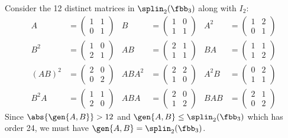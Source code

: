 \begin{sol}
    Consider the 12 distinct matrices in $\splin_2(\fbb_3)$ along with $I_2$:
    \begin{align*}
        A & = 
        \begin{pmatrix}
        1 & 1 \\
        0 & 1
        \end{pmatrix}
        &
        B & = 
        \begin{pmatrix}
        1 & 0 \\
        1 & 1
        \end{pmatrix}
        &
        A^2 & = 
        \begin{pmatrix}
        1 & 2 \\
        0 & 1
        \end{pmatrix}
        \\
        B^2 & = 
        \begin{pmatrix}
        1 & 0 \\
        2 & 1
        \end{pmatrix}
        &
        AB & = 
        \begin{pmatrix}
        2 & 1 \\
        1 & 1
        \end{pmatrix}
        &
        BA & = 
        \begin{pmatrix}
        1 & 1 \\
        1 & 2
        \end{pmatrix}
        \\
        (AB)^2 & = 
        \begin{pmatrix}
        2 & 0 \\
        0 & 2
        \end{pmatrix}
        &
        ABA^2 & = 
        \begin{pmatrix}
        2 & 2 \\
        1 & 0
        \end{pmatrix}
        &
        A^2 B & = 
        \begin{pmatrix}
        0 & 2 \\
        1 & 1
        \end{pmatrix}
        \\
        B^2 A & = 
        \begin{pmatrix}
        1 & 1 \\
        2 & 0
        \end{pmatrix}
        &
        ABA & = 
        \begin{pmatrix}
        2 & 0 \\
        1 & 2
        \end{pmatrix}
        &
        BAB & = 
        \begin{pmatrix}
        2 & 1 \\
        0 & 2
        \end{pmatrix}
    \end{align*}
    Since $\abs{\gen{A, B}} > 12$ and $\gen{A, B} \leq \splin_2(\fbb_3)$ which has order 24, we must have $\gen{A, B} = \splin_2(\fbb_3)$.
\end{sol}

